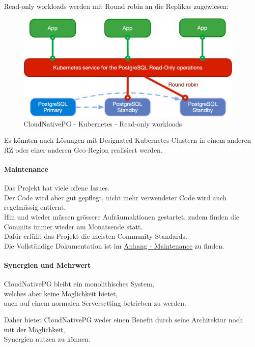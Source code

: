 \begin{flushleft}
    Read-only workloads werden mit Round robin an die Replikas zugewiesen:
    \begin{figure}[H]
        \centering
        \includegraphics[width=0.75\linewidth]{source/implementation/evaluation/postgresql_ha_solutions/cloudnativepg/cloudnativepg-architecture-read-only}
        \caption{CloudNativePG - Kubernetes - Read-only workloads}
        \label{fig:cloudnativepg-architecture-read-only}
    \end{figure}
\end{flushleft}
\begin{flushleft}
    Es könnten auch Lösungen mit Designated Kubernetes-Clustern in einem anderen RZ oder einer anderen Geo-Region realisiert werden.
\end{flushleft}
\begin{flushleft}
    \paragraph{Maintenance}
    Das Projekt hat viele offene Issues.\\
    Der Code wird aber gut gepflegt, nicht mehr verwendeter Code wird auch regelmässig entfernt.\\
    Hin und wieder müssen grössere Aufräumaktionen gestartet, zudem finden die Commits immer wieder am Monatsende statt.\\
    Dafür erfüllt das Projekt die meisten Community Standards.\\
    Die Vollständige Dokumentation ist im \hyperref[subsec:maintenance_cloudnativepg]{Anhang - Maintenance} zu finden.
\end{flushleft}
\begin{flushleft}
    \paragraph{Synergien und Mehrwert}
    CloudNativePG bleibt ein monolithisches System,\\welches aber keine Möglichkeit bietet,\\auch auf einem normalen Serversetting betrieben zu werden.
\end{flushleft}
\begin{flushleft}
    Daher bietet CloudNativePG weder einen Benefit durch seine Architektur noch mit der Möglichkeit,\\Synergien nutzen zu können.
\end{flushleft}
